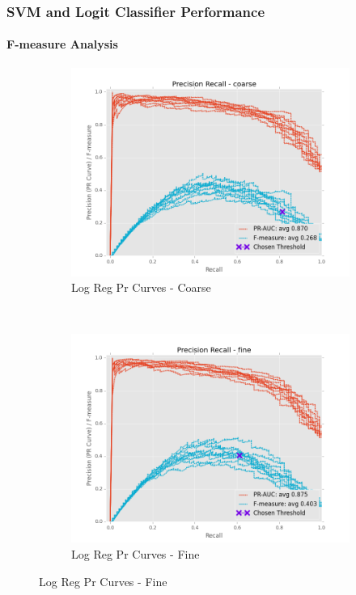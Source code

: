 \documentclass{beamer}
\begin{document}
\begin{frame}
    \frametitle{SVM and Logit Classifier Performance}  %
    \framesubtitle{F-measure Analysis}
    \begin{figure}[!htb]
        \centering
        \begin{subfigure}[t]{0.475\textwidth}
            \centering
            \includegraphics[width=\textwidth]{fig/LogReg_FindThreshold_PrCurve_coarse}
            \caption{Log Reg Pr Curves - Coarse}
        \end{subfigure}
        ~
        \begin{subfigure}[t]{0.475\textwidth}
            \centering
            \includegraphics[width=\textwidth]{fig/LogReg_FindThreshold_PrCurve_fine}
            \caption{Log Reg Pr Curves - Fine}
        \end{subfigure}
        \label{fig:LogRegThreshPr}
    \end{figure}
\end{frame}
\end{document}
